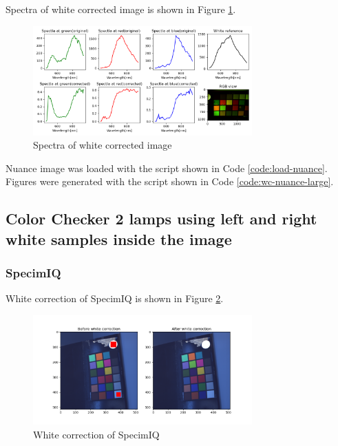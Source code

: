 Spectra of white corrected image is shown in Figure \ref{fig:wc-nuance-camera-large-spectra}.

\begin{figure}[H]
    \centering
    \caption{Spectra of white corrected image}
    \label{fig:wc-nuance-camera-large-spectra}
    \includegraphics[width=0.75\textwidth]{./fig-task1/wc-nuance-spectra-large.png}
\end{figure}

Nuance image was loaded with the script shown in Code \ref{code:load-nuance}.
Figures were generated with the script shown in Code \ref{code:wc-nuance-large}.


\subsection{Color Checker 2 lamps using left and right white samples inside the image}

\subsubsection{SpecimIQ}
White correction of SpecimIQ is shown in Figure \ref{fig:wc-specimiq-small}.

\begin{figure}[H]
    \centering
    \caption{White correction of SpecimIQ}
    \label{fig:wc-specimiq-small}
    \includegraphics[width=0.75\textwidth]{./fig-task1/wc-specimiq-small.png}
\end{figure}

